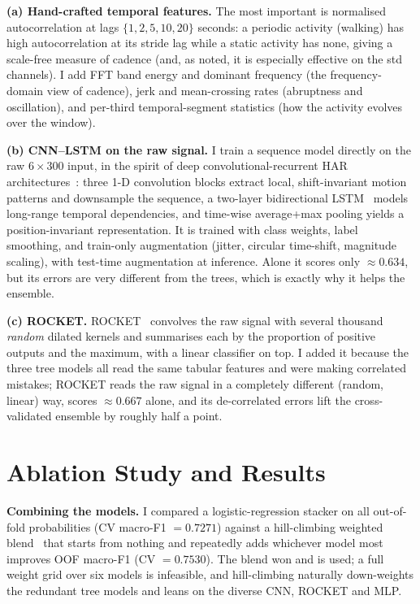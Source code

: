 \documentclass[conference]{IEEEtran}
\begin{document}
\textbf{(a) Hand-crafted temporal features.} The most important is normalised
autocorrelation at lags $\{1,2,5,10,20\}$ seconds: a periodic activity (walking)
has high autocorrelation at its stride lag while a static activity has none, giving
a scale-free measure of cadence (and, as noted, it is especially effective on the
std channels). I add FFT band energy and dominant frequency (the frequency-domain
view of cadence), jerk and mean-crossing rates (abruptness and oscillation), and
per-third temporal-segment statistics (how the activity evolves over the window).

\textbf{(b) CNN--LSTM on the raw signal.} I train a sequence model directly on the
raw $6\times300$ input, in the spirit of deep convolutional-recurrent HAR
architectures~\cite{ordonez2016deep}: three 1-D convolution blocks extract local,
shift-invariant motion patterns and downsample the sequence, a two-layer
bidirectional LSTM~\cite{hochreiter1997long} models long-range temporal
dependencies, and time-wise average+max pooling yields a position-invariant
representation. It is trained with class weights, label smoothing, and train-only
augmentation (jitter, circular time-shift, magnitude scaling), with test-time
augmentation at inference. Alone it scores only $\approx0.634$, but its errors are
very different from the trees, which is exactly why it helps the ensemble.

\textbf{(c) ROCKET.} ROCKET~\cite{dempster2020rocket} convolves the raw signal with
several thousand \emph{random} dilated kernels and summarises each by the proportion
of positive outputs and the maximum, with a linear classifier on top. I added it
because the three tree models all read the same tabular features and were making
correlated mistakes; ROCKET reads the raw signal in a completely different
(random, linear) way, scores $\approx0.667$ alone, and its de-correlated errors lift
the cross-validated ensemble by roughly half a point.

\section{Ablation Study and Results}
\textbf{Combining the models.} I compared a logistic-regression stacker on all
out-of-fold probabilities (CV macro-F1 $=0.7271$) against a hill-climbing weighted
blend~\cite{caruana2004ensemble} that starts from nothing and repeatedly adds
whichever model most improves OOF macro-F1 (CV $=0.7530$). The blend won and is
used; a full weight grid over six models is infeasible, and hill-climbing naturally
down-weights the redundant tree models and leans on the diverse CNN, ROCKET and MLP.
\end{document}
